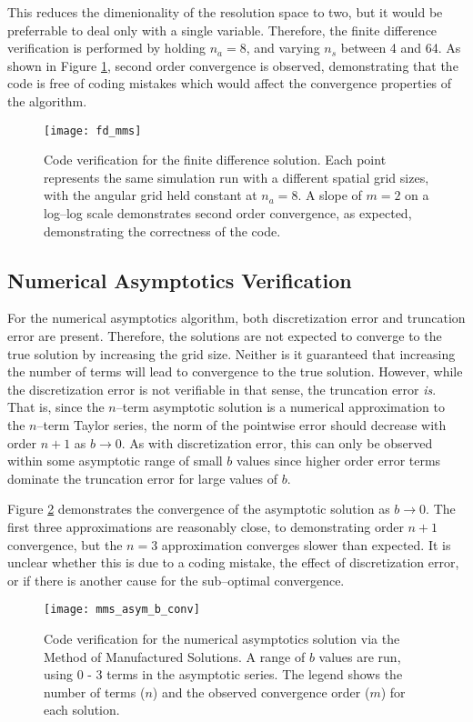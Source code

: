 This reduces the dimenionality of the resolution space to two, but it would be preferrable to deal only with a single variable.
Therefore, the finite difference verification is performed by holding $n_a=8$, and varying $n_s$ between 4 and 64.
As shown in Figure \ref{fig:fd_mms}, second order convergence is observed, demonstrating that the code is free of coding mistakes which would affect the convergence properties of the algorithm.

\begin{figure}[h]
  \centering
  \texttt{[image: fd\_mms]}
  \caption{Code verification for the finite difference solution. Each point represents the same simulation run with a different spatial grid sizes, with the angular grid held constant at $n_a=8$. A slope of $m=2$ on a log--log scale demonstrates second order convergence, as expected, demonstrating the correctness of the code.}
  \label{fig:fd_mms}
\end{figure}

\subsection{Numerical Asymptotics Verification}
\label{sec:num_asym_mms}
For the numerical asymptotics algorithm, both discretization error and truncation error are present.
Therefore, the solutions are not expected to converge to the true solution by increasing the grid size.
Neither is it guaranteed that increasing the number of terms will lead to convergence to the true solution.
However, while the discretization error is not verifiable in that sense, the truncation error \textit{is}.
That is, since the $n$--term asymptotic solution is a numerical approximation to the $n$--term Taylor series, the norm of the pointwise error should decrease with order $n+1$ as $b \to 0$.
As with discretization error, this can only be observed within some asymptotic range of small $b$ values since higher order error terms dominate the truncation error for large values of $b$.

Figure \ref{fig:mms_asym_b_conv} demonstrates the convergence of the asymptotic solution as $b \to 0$.
The first three approximations are reasonably close, to demonstrating order $n+1$ convergence, but the $n=3$ approximation converges slower than expected.
It is unclear whether this is due to a coding mistake, the effect of discretization error, or if there is another cause for the sub--optimal convergence.
\begin{figure}[h]
  \centering
  \texttt{[image: mms\_asym\_b\_conv]}
  \caption{Code verification for the numerical asymptotics solution via the Method of Manufactured Solutions. A range of $b$ values are run, using 0 - 3 terms in the asymptotic series. The legend shows the number of terms ($n$) and the observed convergence order ($m$) for each solution.}
  \label{fig:mms_asym_b_conv}
\end{figure}


